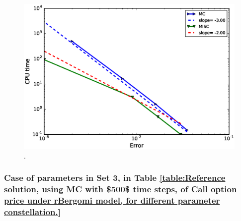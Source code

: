 %			
%

\FloatBarrier


	\begin{figure}[h!]
	\centering
	\includegraphics[width=0.5\linewidth]{./figures/rBergomi_Complexity_rates/set5/error_vs_time_set5_full_comparison}
	
	\caption{.}
	\label{fig:Complexity plot for  MISC for case set $3$ parameters, comparison}
\end{figure}


\FloatBarrier
\subsubsection{Case of parameters in Set 3, in Table \ref{table:Reference solution, using MC with $500$ time steps, of Call option price under rBergomi model, for different parameter constellation.} }\label{sec:Case of set 4 parameters}


